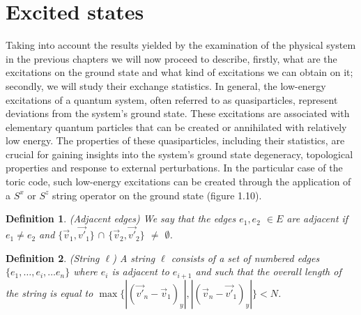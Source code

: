 \documentclass{Configuration_Files/PoliMi3i_thesis}
\newtheorem{definition}{Definition}[chapter]
\begin{document}





















\newpage
\section{Excited states}
\label{sec:ES}


Taking into account the results yielded by the examination of the physical system in the previous chapters we will now proceed to describe, firstly, what are the excitations on the ground state and what kind of excitations we can obtain on it; secondly, we will study their exchange statistics. In general, the low-energy excitations of a quantum system, often referred to as quasiparticles, represent deviations from the system's ground state. These excitations are associated with elementary quantum particles that can be created or annihilated with relatively low energy. The properties of these quasiparticles, including their statistics, are crucial for gaining insights into the system's ground state degeneracy, topological properties and response to external perturbations. \newline
In the particular case of the toric code, such low-energy excitations can be created through the application of a $S^x$ or $S^z$ string operator on the ground state (figure 1.10).

\begin{definition}(Adjacent edges)
	We say that the edges  $e_1, e_2$ $\in E$ are adjacent if $e_1\neq e_2$ and $\{ \vec{v}_1, \vec{v'}_1\}$ $\cap $ $\{ \vec{v}_2, \vec{v'}_2\}$ $\neq$ $\emptyset$.
\end{definition}

\begin{definition}(String $\ell$)
	A string $\ell$ consists of a set of numbered edges $\{e_1, \dots, e_i, \dots e_n\}$ where $e_i$ is adjacent to $e_{i+1}$ and such that the overall length of the string is equal to $\max \{ |(\vec{v'}_n-\vec{v}_1)_y|, |(\vec{v}_n-\vec{v'}_1)_y| \} < N$.
\end{definition}
\end{document}
